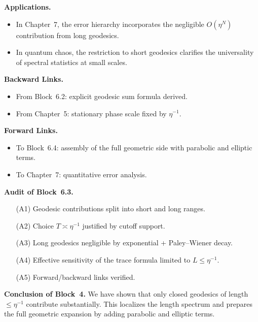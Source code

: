 \medskip

\noindent\textbf{Applications.}
\begin{itemize}
  \item In Chapter~7, the error hierarchy incorporates the negligible $O(\eta^N)$ contribution from long geodesics.
  \item In quantum chaos, the restriction to short geodesics clarifies the universality of spectral statistics at small scales.
\end{itemize}

\medskip

\noindent\textbf{Backward Links.}
\begin{itemize}
  \item From Block~6.2: explicit geodesic sum formula derived.
  \item From Chapter~5: stationary phase scale fixed by $\eta^{-1}$.
\end{itemize}

\medskip

\noindent\textbf{Forward Links.}
\begin{itemize}
  \item To Block~6.4: assembly of the full geometric side with parabolic and elliptic terms.
  \item To Chapter~7: quantitative error analysis.
\end{itemize}

\medskip

\noindent\textbf{Audit of Block~6.3.}
\begin{itemize}
  \item[(A1)] Geodesic contributions split into short and long ranges.
  \item[(A2)] Choice $T\asymp \eta^{-1}$ justified by cutoff support.
  \item[(A3)] Long geodesics negligible by exponential + Paley–Wiener decay.
  \item[(A4)] Effective sensitivity of the trace formula limited to $L\leq \eta^{-1}$.
  \item[(A5)] Forward/backward links verified.
\end{itemize}

\medskip

\noindent\textbf{Conclusion of Block~4.}
We have shown that only closed geodesics of length $\leq \eta^{-1}$ contribute substantially.  
This localizes the length spectrum and prepares the full geometric expansion by adding parabolic and elliptic terms.


